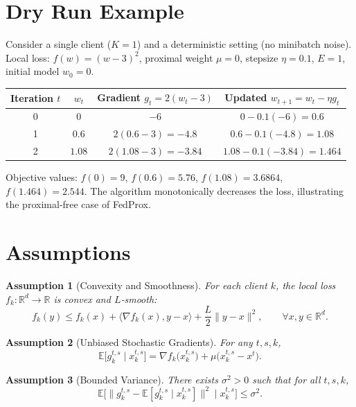 \documentclass[11pt]{article}
\newtheorem{assumption}{Assumption}
\begin{document}
\section*{Dry Run Example}
Consider a single client ($K=1$) and a deterministic setting (no minibatch noise).  
Local loss: $f(w)=(w-3)^{2}$, proximal weight $\mu=0$, stepsize $\eta=0.1$, $E=1$, initial model $w_{0}=0$.

\begin{center}
\begin{tabular}{c|c|c|c}
Iteration $t$ & $w_{t}$ & Gradient $g_{t}=2(w_{t}-3)$ & Updated $w_{t+1}=w_{t}-\eta g_{t}$ \\ \hline
0 & $0$ & $-6$ & $0-0.1(-6)=0.6$ \\
1 & $0.6$ & $2(0.6-3)=-4.8$ & $0.6-0.1(-4.8)=1.08$ \\
2 & $1.08$ & $2(1.08-3)=-3.84$ & $1.08-0.1(-3.84)=1.464$ \\
\end{tabular}
\end{center}
Objective values: $f(0)=9$, $f(0.6)=5.76$, $f(1.08)=3.6864$, $f(1.464)=2.544$. The algorithm monotonically decreases the loss, illustrating the proximal‑free case of FedProx.

\newpage
\section*{Assumptions}
\begin{assumption}[Convexity and Smoothness]\label{ass:convex}
For each client $k$, the local loss $f_k:\mathbb{R}^{d}\!\to\!\mathbb{R}$ is convex and $L$‑smooth:
\[
    f_k(y)\le f_k(x)+\langle\nabla f_k(x),y-x\rangle+\frac{L}{2}\|y-x\|^{2},
    \qquad\forall x,y\in\mathbb{R}^{d}.
\]
\end{assumption}

\begin{assumption}[Unbiased Stochastic Gradients]\label{ass:unbiased}
For any $t,s,k$,
\[
    \mathbb{E}\!\bigl[g_{k}^{t,s}\mid x_{k}^{t,s}\bigr]
        =\nabla f_k\!\bigl(x_{k}^{t,s}\bigr)+\mu\bigl(x_{k}^{t,s}-x^{t}\bigr).
\]
\end{assumption}

\begin{assumption}[Bounded Variance]\label{ass:variance}
There exists $\sigma^{2}>0$ such that for all $t,s,k$,
\[
    \mathbb{E}\!\bigl[\|g_{k}^{t,s}-\mathbb{E}[g_{k}^{t,s}\mid x_{k}^{t,s}]\|^{2}\mid x_{k}^{t,s}\bigr]\le\sigma^{2}.
\]
\end{assumption}
\end{document}
